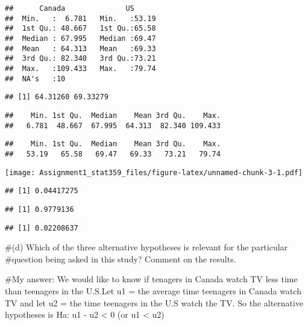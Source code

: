 \documentclass[
]{article}
\begin{document}
\begin{verbatim}
##      Canada              US       
##  Min.   :  6.781   Min.   :53.19  
##  1st Qu.: 48.667   1st Qu.:65.58  
##  Median : 67.995   Median :69.47  
##  Mean   : 64.313   Mean   :69.33  
##  3rd Qu.: 82.340   3rd Qu.:73.21  
##  Max.   :109.433   Max.   :79.74  
##  NA's   :10
\end{verbatim}

\begin{verbatim}
## [1] 64.31260 69.33279
\end{verbatim}

\begin{verbatim}
##    Min. 1st Qu.  Median    Mean 3rd Qu.    Max. 
##   6.781  48.667  67.995  64.313  82.340 109.433
\end{verbatim}

\begin{verbatim}
##    Min. 1st Qu.  Median    Mean 3rd Qu.    Max. 
##   53.19   65.58   69.47   69.33   73.21   79.74
\end{verbatim}

\texttt{[image: Assignment1\_stat359\_files/figure-latex/unnamed-chunk-3-1.pdf]}

\begin{verbatim}
## [1] 0.04417275
\end{verbatim}

\begin{verbatim}
## [1] 0.9779136
\end{verbatim}

\begin{verbatim}
## [1] 0.02208637
\end{verbatim}

\#(d) Which of the three alternative hypotheses is relevant for the
particular \#question being asked in this study? Comment on the results.

\#My answer: We would like to know if tenagers in Canada watch TV less
time than teenagers in the U.S.Let u1 = the average time teenagers in
Canada watch TV and let u2 = the time teenagers in the U.S watch the TV.
So the alternative hypotheses is Ha: u1 - u2 \textless{} 0 (or u1
\textless{} u2)
\end{document}
